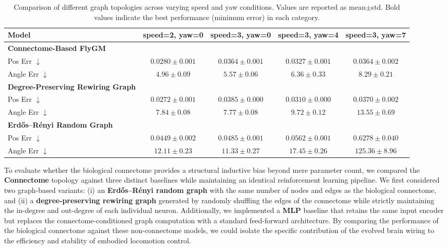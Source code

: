 \documentclass{article}
\theoremstyle{plain}
\theoremstyle{definition}
\theoremstyle{remark}
\begin{document}
\begin{table}[t]
\centering
\small
\begin{tabular}{lcccc}
\toprule
\textbf{Model} & \textbf{speed=2, yaw=0} & \textbf{speed=3, yaw=0} & \textbf{speed=3, yaw=4} & \textbf{speed=3, yaw=7} \\
\midrule
\textbf{Connectome-Based FlyGM} & & & & \\
\quad Pos Err $\downarrow$ & $0.0280\pm0.001$ & \boldmath$0.0364\pm0.001$ & $0.0327\pm0.001$ & \boldmath$0.0364\pm0.002$ \\
\quad Angle Err $\downarrow$ & \boldmath$4.96\pm0.09$ & \boldmath$5.57\pm0.06$ & \boldmath$6.36\pm0.33$ & \boldmath$8.29\pm0.21$ \\
\midrule
\textbf{Degree-Preserving Rewiring Graph} & & & & \\
\quad Pos Err $\downarrow$ & \boldmath$0.0272\pm0.001$ & $0.0385\pm0.000$ & \boldmath$0.0310\pm0.000$ & $0.0370\pm0.002$ \\
\quad Angle Err $\downarrow$ & $7.84\pm0.08$ & $7.77\pm0.08$ & $9.72\pm0.12$ & $13.55\pm0.69$ \\
\midrule
\textbf{Erd\H{o}s--R\'enyi Random Graph} & & & & \\
\quad Pos Err $\downarrow$ & $0.0449\pm0.002$ & $0.0485\pm0.001$ & $0.0562\pm0.001$ & $0.6278\pm0.040$ \\
\quad Angle Err $\downarrow$ & $12.11\pm0.23$ & $11.33\pm0.27$ & $17.45\pm0.26$ & $125.36\pm8.96$ \\
\bottomrule
\end{tabular}
\caption{Comparison of different graph topologies across varying speed and yaw conditions. Values are reported as mean$\pm$std. Bold values indicate the best performance (minimum error) in each category.}
\label{tab:topology_reduction}
\vskip -0.1in
\end{table}

To evaluate whether the biological connectome provides a structural inductive bias beyond mere parameter count, we compared the \textbf{Connectome} topology against three distinct baselines while maintaining an identical reinforcement learning pipeline. We first considered two graph-based variants: (i) an \textbf{Erd\H{o}s--R\'enyi random graph} with the same number of nodes and edges as the biological connectome, and (ii) a \textbf{degree-preserving rewiring graph} generated by randomly shuffling the edges of the connectome while strictly maintaining the in-degree and out-degree of each individual neuron. Additionally, we implemented a \textbf{MLP} baseline that retains the same input encoder but replaces the connectome-conditioned graph computation with a standard feed-forward architecture. By comparing the performance of the biological connectome against these non-connectome models, we could isolate the specific contribution of the evolved brain wiring to the efficiency and stability of embodied locomotion control.
\end{document}

